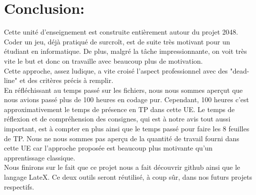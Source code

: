 \documentclass{report}
\begin{document}
\chapter{Conclusion:}
Cette unité d'enseignement est construite entièrement autour du projet 2048. Coder un jeu, déjà pratiqué de surcroît, est de suite très motivant pour un étudiant en informatique. De plus, malgré la tâche impressionnante, on voit très vite le but et donc on travaille avec beaucoup plus de motivation.\\
Cette approche, assez ludique, a vite croisé l'aspect professionnel avec des "dead-line" et des critères précis à remplir.\\
En réfléchissant au temps passé sur les fichiers, nous nous sommes aperçut que nous avions passé plus de 100 heures en codage pur. Cependant, 100 heures c'est approximativement le temps de présence en TP dans cette UE. Le temps de réflexion et de compréhension des consignes, qui est à notre avis tout aussi important, est à compter en plus ainsi que le temps passé pour faire les 8 feuilles de TP. Nous ne nous sommes pas aperçu de la quantité de travail fourni dans cette UE car l'approche proposée est beaucoup plus motivante qu'un apprentissage classique.\\
Nous finirons sur le fait que ce projet nous a fait découvrir github ainsi que le langage LateX. Ce deux outils seront réutilisé, à coup sûr, dans nos futurs projets respectifs.
\end{document}
